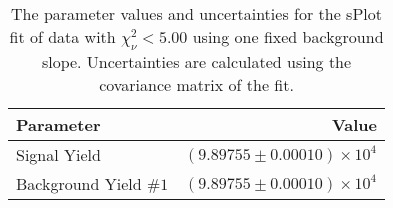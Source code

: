 
\begin{table}[ht]
    \begin{center}
        \begin{tabular}{lr}\toprule
            Parameter & Value \\\midrule
            Signal Yield & $(9.89755 \pm 0.00010) \times 10^{4}$ \\
            Background Yield $\#1$ & $(9.89755 \pm 0.00010) \times 10^{4}$ \\\bottomrule
        \end{tabular}
        \caption{The parameter values and uncertainties for the sPlot fit of data with $\chi^2_\nu < 5.00$ using one fixed background slope. Uncertainties are calculated using the covariance matrix of the fit.}\label{tab:splot-fit-results-chisqdof-5.00-fixed-1}
    \end{center}
\end{table}
